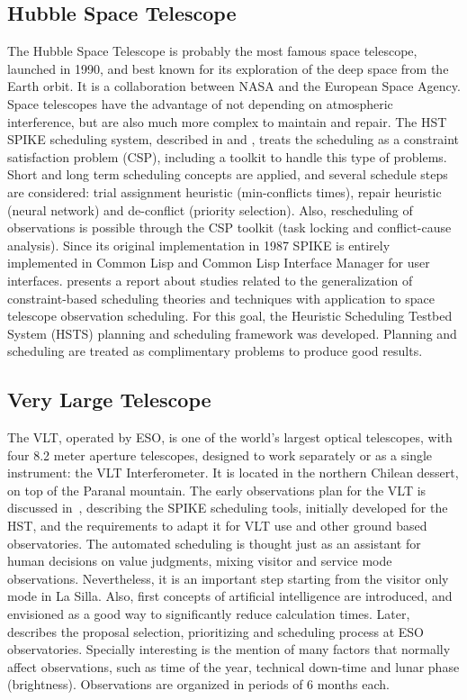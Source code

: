 \subsection{Hubble Space Telescope}
The Hubble Space Telescope is probably the most famous space telescope, launched in 1990, and best known for its exploration of the deep space from the Earth orbit. It is a collaboration between NASA and the European Space Agency. Space telescopes have the advantage of not depending on atmospheric interference, but are also much more complex to maintain and repair. The HST SPIKE scheduling system, described in \cite{johnston90} and \cite{zweben94}, treats the scheduling as a constraint satisfaction problem (CSP), including a toolkit to handle this type of problems. Short and long term scheduling concepts are applied, and several schedule steps are considered: trial assignment heuristic (min-conflicts times), repair heuristic (neural network) and de-conflict (priority selection). Also, rescheduling of observations is possible through the CSP toolkit (task locking and conflict-cause analysis). Since its original implementation in 1987 SPIKE is entirely implemented in Common Lisp and Common Lisp Interface Manager for user interfaces. \cite{muscettola96} presents a report about studies related to the generalization of constraint-based scheduling theories and techniques with application to space telescope observation scheduling. For this goal, the Heuristic Scheduling Testbed System (HSTS) planning and scheduling framework was developed. Planning and scheduling are treated as complimentary problems to produce good results.

\subsection{Very Large Telescope}
The VLT, operated by ESO, is one of the world's largest optical telescopes, with four 8.2 meter aperture telescopes, designed to work separately or as a single instrument: the VLT Interferometer. It is located in the northern Chilean dessert, on top of the Paranal mountain. The early observations plan for the VLT is discussed in~\cite{johnston88}, describing the SPIKE scheduling tools, initially developed for the HST, and the requirements to adapt it for VLT use and other ground based observatories. The automated scheduling is thought just as an assistant for human decisions on value judgments, mixing visitor and service mode observations. Nevertheless, it is an important step starting from the visitor only mode in La
Silla. Also, first concepts of artificial intelligence are introduced, and envisioned as a good way to significantly reduce calculation times. Later, \cite{silva02} describes the proposal selection, prioritizing and scheduling process at ESO observatories.
Specially interesting is the mention of many factors that normally affect observations, such as time of the year, technical down-time and lunar phase (brightness). Observations are organized in periods of 6 months each.

